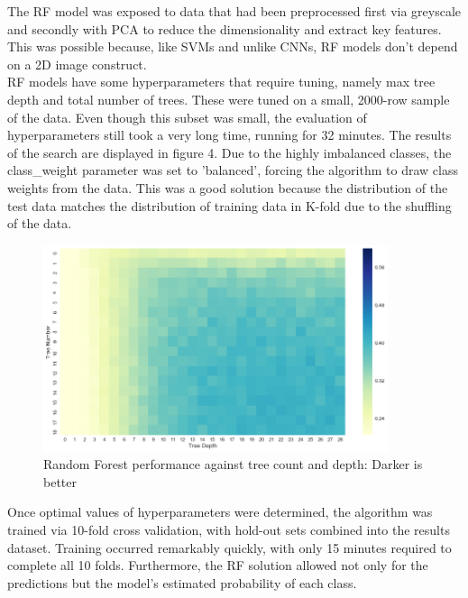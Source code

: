 \documentclass[12pt]{article}
\begin{document}
The RF model was exposed to data that had been preprocessed first via greyscale and secondly with PCA to reduce the dimensionality and extract key features. This was possible because, like SVMs and unlike CNNs, RF models don't depend on a 2D image construct.\\

RF models have some hyperparameters that require tuning, namely max tree depth and total number of trees. These were tuned on a small, 2000-row sample of the data. Even though this subset was small, the evaluation of hyperparameters still took a very long time, running for 32 minutes. The results of the search are displayed in figure 4.  Due to the highly imbalanced classes, the class\_weight parameter was set to 'balanced', forcing the algorithm to draw class weights from the data. This was a good solution because the distribution of the test data matches the distribution of training data in K-fold due to the shuffling of the data.
\\
\begin{figure}[h]
\caption{Random Forest performance against tree count and depth: Darker is better}
\centering
\includegraphics[width=0.9\textwidth]{images/random_forest_hyperparams.png}
\end{figure}


Once optimal values of hyperparameters were determined, the algorithm was trained via 10-fold cross validation, with hold-out sets combined into the results dataset. Training occurred remarkably quickly, with only 15 minutes required to complete all 10 folds. Furthermore, the RF solution allowed not only for the predictions but the model's estimated probability of each class.
\end{document}
